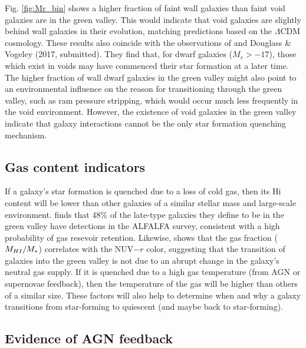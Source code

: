 Fig. \ref{fig:Mr_bin} shows a higher fraction of faint wall galaxies than faint 
void galaxies are in the green valley.  This would indicate that void galaxies 
are slightly behind wall galaxies in their evolution, matching predictions based 
on the $\Lambda$CDM cosmology.  These results also coincide with the 
observations of \cite{Douglass17b} and Douglass \& Vogeley (2017, submitted).  
They find that, for dwarf galaxies ($M_r > -17$), those which exist in voids may 
have commenced their star formation at a later time.  The higher fraction of 
wall dwarf galaxies in the green valley might also point to an environmental 
influence on the reason for transitioning through the green valley, such as ram 
pressure stripping, which would occur much less frequently in the void 
environment.  However, the existence of void galaxies in the green valley 
indicate that galaxy interactions cannot be the only star formation quenching 
mechanism.


\subsection{Gas content indicators}

If a galaxy's star formation is quenched due to a loss of cold gas, then its 
H{\sc i} content will be lower than other galaxies of a similar stellar mass and 
large-scale environment.  \cite{Schawinski14} finds that 48\% of the late-type 
galaxies they define to be in the green valley have  detections in the 
ALFALFA survey, consistent with a high probability of gas resevoir retention.  
Likewise, \cite{Catinella12} shows that the gas fraction ($M_{\ion{H}{1}}/M_*$) 
correlates with the NUV$-r$ color, suggesting that the transition of galaxies 
into the green valley is not due to an abrupt change in the galaxy's neutral gas 
supply.  If it is quenched due to a high gas temperature (from AGN or supernovae 
feedback), then the temperature of the gas will be higher than others of a 
similar size.  These factors will also help to determine when and why a galaxy 
transitions from star-forming to quiescent (and maybe back to star-forming).


\subsection{Evidence of AGN feedback}

